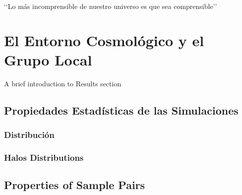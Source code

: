 \begin{savequote}[50mm]
‘‘Lo más incomprensible de nuestro universo es que sea comprensible’’
\end{savequote}




\chapter{El Entorno Cosmológico y el Grupo Local}
\label{cha:Results}

A brief introduction to Results section




\section{Propiedades Estadísticas de las Simulaciones}
\label{sec:StatisticalPropertiesOfAllSimulations}


	\subsection{Distribución}
	\label{subsec:EnvironmentDistributions}


	\subsection{Halos Distributions}
	\label{subsec:HalosDistributions}






\section{Properties of Sample Pairs}
\label{sec:PropertiesOfSamplePairs}


